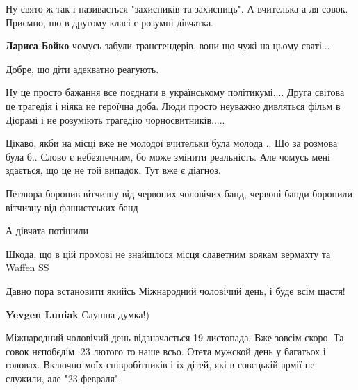 \begin{itemize}

Ну свято ж так і називається "захисників та захисниць". А вчителька а-ля совок.
Приємно, що в другому класі є розумні дівчатка.

\begin{itemize} %
\textbf{Лариса Бойко} чомусь забули трансгендерів, вони що чужі на цьому святі...
\end{itemize} %

Добре, що діти адекватно реагують.


Ну це просто бажання все поєднати в українському політикумі.... Друга світова
це трагедія і ніяка не героїчна доба. Люди просто неуважно дивляться фільм в
Діорамі і не розуміють трагедію чорносвитників.....


Цікаво, якби на місці вже не молодої вчительки була молода .. Що за розмова була
б.. Слово є небезпечним, бо може змінити реальність. Але чомусь мені здається, що
це не той випадок. Тут вже є діагноз.


Петлюра боронив вітчизну від червоних чоловічих банд, червоні банди боронили
вітчизну від фашистських банд

\begin{itemize} %
А дівчата потішили
\end{itemize} %

Шкода, що в цій промові не знайшлося місця славетним воякам вермахту та Waffen SS


Давно пора встановити якийсь Міжнародний чоловічий день, і буде всім щастя!

\begin{itemize} %
\textbf{Yevgen Luniak} Слушна думка!)


Міжнародний чоловічий день відзначається 19 листопада. Вже зовсім скоро. Та
совок нєпобєдім. 23 лютого то наше всьо. Отета мужской день у багатьох і
головах. Включно моїх співробітників і їх дітей, які в совєцькій армії не
служили, але "23 февраля".

\end{itemize} %



\end{itemize}

